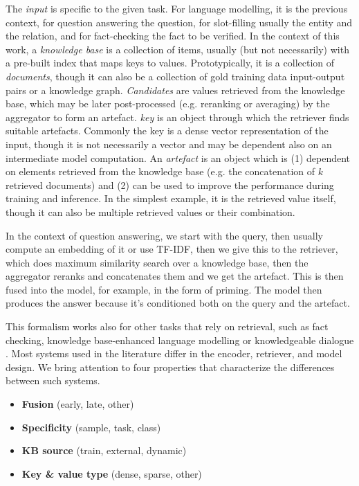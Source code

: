 The \textit{input} is specific to the given task.
For language modelling, it is the previous context, for question answering the question, for slot-filling usually the entity and the relation, and for fact-checking the fact to be verified.
In the context of this work, a \textit{knowledge base} is a collection of items, usually (but not necessarily) with a pre-built index that maps keys to values.
Prototypically, it is a collection of \textit{documents}, though it can also be a collection of gold training data input-output pairs or a knowledge graph.
\textit{Candidates} are values retrieved from the knowledge base, which may be later post-processed (e.g. reranking or averaging) by the aggregator to form an artefact.
\textit{key} is an object through which the retriever finds suitable artefacts. Commonly the key is a dense vector representation of the input, though it is not necessarily a vector and may be dependent also on an intermediate model computation.
An \textit{artefact} is an object which is (1) dependent on elements retrieved from the knowledge base (e.g. the concatenation of $k$ retrieved documents) and (2) can be used to improve the performance during training and inference. In the simplest example, it is the retrieved value itself, though it can also be multiple retrieved values or their combination.


In the context of question answering, we start with the query, then usually compute an embedding of it or use TF-IDF, then we give this to the retriever, which does maximum similarity search over a knowledge base, then the aggregator reranks and concatenates them and we get the artefact.
This is then fused into the model, for example, in the form of priming.
The model then produces the answer because it's conditioned both on the query and the artefact.

This formalism works also for other tasks that rely on retrieval, such as fact checking, knowledge base-enhanced language modelling or knowledgeable dialogue \citep{zouhar2021artefact}.
Most systems used in the literature differ in the encoder, retriever, and model design. We bring attention to four properties that characterize the differences between such systems.

\begin{itemize}
    \item \textbf{Fusion} (early, late, other)
    \item \textbf{Specificity} (sample, task, class)
    \item \textbf{KB source} (train, external, dynamic)
    \item \textbf{Key \& value type} (dense, sparse, other)
\end{itemize}

